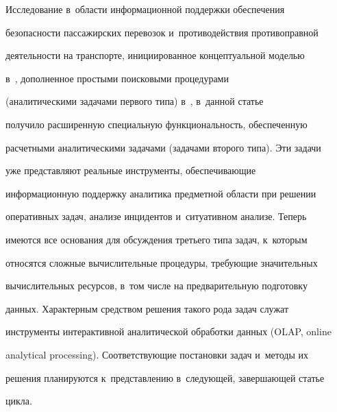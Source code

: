 Исследование в~области информационной поддержки обеспечения 


безопасности пассажирских перевозок и~противодействия противоправной 


деятельности на транспорте, инициированное концептуальной моделью 


в~\cite{1-bos}, дополненное прос\-ты\-ми поисковыми процедурами 


(аналитическими задачами первого типа) в~\cite{2-bos}, в~данной статье 


получило расширенную специальную функ\-ци\-о\-наль\-ность, обеспеченную 


расчетными аналитическими задачами (задачами второго типа). Эти задачи 


уже пред\-став\-ля\-ют реальные инструменты, обеспечивающие 


информационную поддержку аналитика предметной об\-ласти при решении 


оперативных задач, анализе инцидентов и~ситуативном анализе. Теперь 


имеются все основания для обсуж\-де\-ния третьего типа задач, к~которым 


относятся слож\-ные вы\-чис\-ли\-тель\-ные процедуры, тре\-бу\-ющие значительных 


вычислительных ресурсов, в~том чис\-ле на предварительную подготовку 


данных. Характерным средством решения такого рода задач служат 


инструменты интерактивной аналитической обработки данных (OLAP, online 


analytical processing). Соответствующие по\-ста\-но\-вки задач и~методы их 


решения планируются к~пред\-став\-ле\-нию в~сле\-ду\-ющей, за\-вер\-ша\-ющей \mbox{статье} 


\mbox{цикла}.





